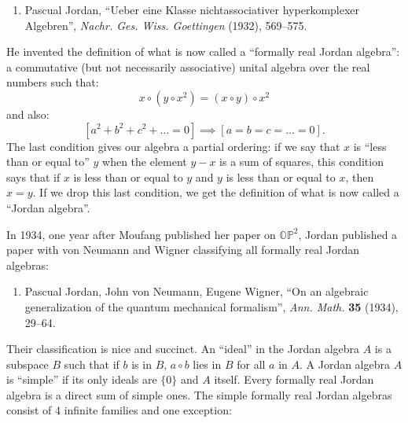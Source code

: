\documentclass{article}
\def\tightlist{}
\begin{document}
\begin{enumerate}
\def\labelenumi{\arabic{enumi})}
\setcounter{enumi}{5}
\tightlist
\item
  Pascual Jordan, ``Ueber eine Klasse nichtassociativer hyperkomplexer
  Algebren'', \emph{Nachr. Ges. Wiss. Goettingen} (1932), 569--575.
\end{enumerate}

He invented the definition of what is now called a ``formally real
Jordan algebra'': a commutative (but not necessarily associative) unital
algebra over the real numbers such that:
\[x\circ (y\circ x^2) = (x\circ y)\circ x^2\] and also:
\[[a^2 + b^2 + c^2 + \ldots = 0] \implies [a = b = c = \ldots = 0].\]
The last condition gives our algebra a partial ordering: if we say that
\(x\) is ``less than or equal to'' \(y\) when the element \(y-x\) is a
sum of squares, this condition says that if \(x\) is less than or equal
to \(y\) and \(y\) is less than or equal to \(x\), then \(x = y\). If we
drop this last condition, we get the definition of what is now called a
``Jordan algebra''.

In 1934, one year after Moufang published her paper on
\(\mathbb{OP}^2\), Jordan published a paper with von Neumann and Wigner
classifying all formally real Jordan algebras:

\begin{enumerate}
\def\labelenumi{\arabic{enumi})}
\setcounter{enumi}{6}
\tightlist
\item
  Pascual Jordan, John von Neumann, Eugene Wigner, ``On an algebraic
  generalization of the quantum mechanical formalism'', \emph{Ann.
  Math.} \textbf{35} (1934), 29--64.
\end{enumerate}

Their classification is nice and succinct. An ``ideal'' in the Jordan
algebra \(A\) is a subspace \(B\) such that if \(b\) is in \(B\),
\(a\circ b\) lies in \(B\) for all \(a\) in \(A\). A Jordan algebra
\(A\) is ``simple'' if its only ideals are \(\{0\}\) and \(A\) itself.
Every formally real Jordan algebra is a direct sum of simple ones. The
simple formally real Jordan algebras consist of 4 infinite families and
one exception:
\end{document}
